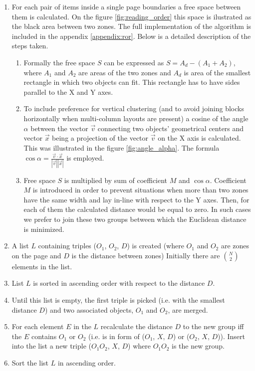 \begin{enumerate}
\item For each pair of items inside a single page boundaries a free space between them is calculated. On the figure \ref{fig:reading_order} this space is ilustrated as the black area between two zones. The full implementation of the algorithm is included in the appendix \ref{appendix:ror}. Below is a detailed description of the steps taken.
	\begin{enumerate} 
	\item Formally the free space $S$ can be expressed as $S = A_d - (A_1+A_2)$, where $A_1$ and $A_2$ are areas of the two zones and $A_d$ is area of the smallest rectangle in which two objects can fit. This rectangle has to have sides parallel to the X and Y axes.
	\item To include preference for vertical clustering (and to avoid joining blocks horizontally when multi-column layouts are present) a cosine of the angle $\alpha$ between the vector $\vec{v}$ connecting two objects' geometrical centers and vector $\vec{x}$ being a projection of the vector $\vec{v}$ on the X axis is calculated. This was illustrated in the figure \ref{fig:angle_alpha}. The formula $\cos\alpha = \frac{\vec{v} \cdot \vec{x}}{|\vec{v}||\vec{x}|}$ is employed.
	\item Free space $S$ is multiplied by sum of coefficient $M$ and $\cos\alpha$. Coefficient $M$ is introduced in order to prevent situations when more than two zones have the same width and lay in-line with respect to the Y axes. Then, for each of them the calculated distance would be equal to zero. In such cases we prefer to join these two groups between which the Euclidean distance is minimized.
	\end{enumerate}
\item A list $L$ containing triples ($O_1$, $O_2$, $D$) is created (where $O_1$ and $O_2$ are zones on the page and $D$ is the distance between zones) Initially there are $\binom{N}{2}$ elements in the list.
\item List $L$ is sorted in ascending order with respect to the distance $D$. 
\item Until this list is empty, the first triple is picked (i.e. with the smallest distance $D$) and two associated objects, $O_1$ and $O_2$, are merged.
\item For each element $E$ in the $L$ recalculate the distance $D$ to the new group iff the $E$ contains $O_1$ or $O_2$ (i.e. is in form of ($O_1$, $X$, $D$) or ($O_2$, $X$, $D$)).  Insert into the list a new triple ($O_1O_2$, $X$, $D$) where $O_1O_2$ is the new group.
\item Sort the list $L$ in ascending order.
\end{enumerate}
